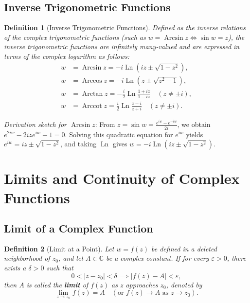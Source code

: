 \documentclass[11pt,a4paper]{article}
\DeclareMathOperator{\Ln}{Ln}
\DeclareMathOperator{\Arcsin}{Arcsin}
\DeclareMathOperator{\Arccos}{Arccos}
\DeclareMathOperator{\Arctan}{Arctan}
\DeclareMathOperator{\Arccot}{Arccot}
\theoremstyle{breakdef}
\newtheorem{definition}{Definition}
\theoremstyle{breakthm}
\begin{document}
\subsection{Inverse Trigonometric Functions}

\begin{definition}[Inverse Trigonometric Functions]
Defined as the inverse relations of the complex trigonometric functions (such as $w = \Arcsin z \iff \sin w = z$), the inverse trigonometric functions are infinitely many-valued and are expressed in terms of the complex logarithm as follows:
\begin{align*}
    w &= \Arcsin z = -i\Ln\left(iz \pm \sqrt{1 - z^2}\right), \\
    w &= \Arccos z = -i\Ln\left(z \pm \sqrt{z^2 - 1}\right), \\
    w &= \Arctan z = -\frac{i}{2}\Ln\frac{1 + iz}{1 - iz} \quad (z \neq \pm i), \\
    w &= \Arccot z = \frac{i}{2}\Ln\frac{z - i}{z + i} \quad (z \neq \pm i).
\end{align*}
\end{definition}

\textit{Derivation sketch for $\Arcsin z$}: From $z = \sin w = \frac{e^{iw} - e^{-iw}}{2i}$, we obtain $e^{2iw} - 2ize^{iw} - 1 = 0$. Solving this quadratic equation for $e^{iw}$ yields $e^{iw} = iz \pm \sqrt{1 - z^2}$, and taking $\Ln$ gives $w = -i\Ln(iz \pm \sqrt{1 - z^2})$.

\section{Limits and Continuity of Complex Functions}

\subsection{Limit of a Complex Function}

\begin{definition}[Limit at a Point]
Let $w = f(z)$ be defined in a deleted neighborhood of $z_0$, and let $A \in \mathbb{C}$ be a complex constant. If for every $\varepsilon > 0$, there exists a $\delta > 0$ such that
\[
    0 < |z - z_0| < \delta \implies |f(z) - A| < \varepsilon,
\]
then $A$ is called the \textbf{limit} of $f(z)$ as $z$ approaches $z_0$, denoted by
\[
    \lim_{z \to z_0} f(z) = A \quad (\text{or } f(z) \to A \text{ as } z \to z_0).
\]
\end{definition}
\end{document}
